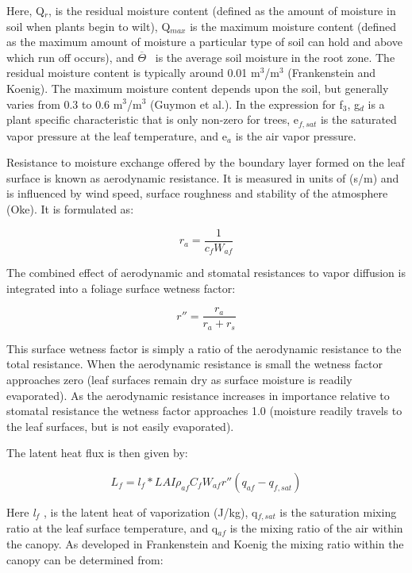 Here, Q\(_{r}\), is the residual moisture content (defined as the amount of moisture in soil when plants begin to wilt), Q\(_{max}\) is the maximum moisture content (defined as the maximum amount of moisture a particular type of soil can hold and above which run off occurs), and \(\overline \Theta\) ~is the average soil moisture in the root zone. The residual moisture content is typically around 0.01 m\(^{3}\)/m\(^{3}\) (Frankenstein and Koenig). The maximum moisture content depends upon the soil, but generally varies from 0.3 to 0.6 m\(^{3}\)/m\(^{3}\) (Guymon et al.). In the expression for f\(_{3}\), g\(_{d}\) is a plant specific characteristic that is only non-zero for trees, e\(_{f,sat}\) is the saturated vapor pressure at the leaf temperature, and e\(_{a}\) is the air vapor pressure.

Resistance to moisture exchange offered by the boundary layer formed on the leaf surface is known as aerodynamic resistance. It is measured in units of (s/m) and is influenced by wind speed, surface roughness and stability of the atmosphere (Oke). It is formulated as:

\begin{equation}
{r_a} = \frac{1}{{{c_f}{W_{af}}}}
\end{equation}

The combined effect of aerodynamic and stomatal resistances to vapor diffusion is integrated into a foliage surface wetness factor:

\begin{equation}
r'' = \frac{{{r_a}}}{{{r_a} + {r_s}}}
\end{equation}

This surface wetness factor is simply a ratio of the aerodynamic resistance to the total resistance. When the aerodynamic resistance is small the wetness factor approaches zero (leaf surfaces remain dry as surface moisture is readily evaporated). As the aerodynamic resistance increases in importance relative to stomatal resistance the wetness factor approaches 1.0 (moisture readily travels to the leaf surfaces, but is not easily evaporated).

The latent heat flux is then given by:

\begin{equation}
{L_f} = {l_f} * LAI{\rho_{af}}{C_f}{W_{af}}{r''}\left( {{q_{af}} - {q_{f,sat}}} \right)
\end{equation}

Here \emph{l\(_{f}\)} , is the latent heat of vaporization (J/kg), q\(_{f,sat}\) is the saturation mixing ratio at the leaf surface temperature, and q\(_{af}\) is the mixing ratio of the air within the canopy. As developed in Frankenstein and Koenig the mixing ratio within the canopy can be determined from:

